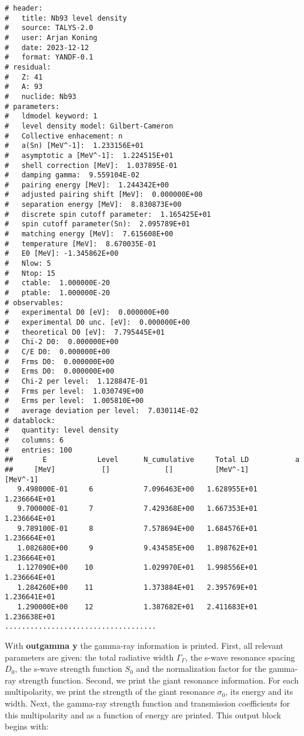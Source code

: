 \begin{samplecase}
{\begin{verbatim}
# header:
#   title: Nb93 level density
#   source: TALYS-2.0
#   user: Arjan Koning
#   date: 2023-12-12
#   format: YANDF-0.1
# residual:
#   Z: 41
#   A: 93
#   nuclide: Nb93
# parameters:
#   ldmodel keyword: 1
#   level density model: Gilbert-Cameron
#   Collective enhacement: n
#   a(Sn) [MeV^-1]:  1.233156E+01
#   asymptotic a [MeV^-1]:  1.224515E+01
#   shell correction [MeV]:  1.037895E-01
#   damping gamma:  9.559104E-02
#   pairing energy [MeV]:  1.244342E+00
#   adjusted pairing shift [MeV]:  0.000000E+00
#   separation energy [MeV]:  8.830873E+00
#   discrete spin cutoff parameter:  1.165425E+01
#   spin cutoff parameter(Sn):  2.095789E+01
#   matching energy [MeV]:  7.615608E+00
#   temperature [MeV]:  8.670035E-01
#   E0 [MeV]: -1.345862E+00
#   Nlow: 5
#   Ntop: 15
#   ctable:  1.000000E-20
#   ptable:  1.000000E-20
# observables:
#   experimental D0 [eV]:  0.000000E+00
#   experimental D0 unc. [eV]:  0.000000E+00
#   theoretical D0 [eV]:  7.795445E+01
#   Chi-2 D0:  0.000000E+00
#   C/E D0:  0.000000E+00
#   Frms D0:  0.000000E+00
#   Erms D0:  0.000000E+00
#   Chi-2 per level:  1.128847E-01
#   Frms per level:  1.030749E+00
#   Erms per level:  1.005810E+00
#   average deviation per level:  7.030114E-02
# datablock:
#   quantity: level density
#   columns: 6
#   entries: 100
##       E            Level      N_cumulative     Total LD           a       
##     [MeV]           []             []          [MeV^-1]       [MeV^-1]    
   9.498000E-01     6            7.096463E+00   1.628955E+01   1.236664E+01 
   9.700000E-01     7            7.429368E+00   1.667353E+01   1.236664E+01 
   9.789100E-01     8            7.578694E+00   1.684576E+01   1.236664E+01 
   1.082680E+00     9            9.434585E+00   1.898762E+01   1.236664E+01 
   1.127090E+00    10            1.029970E+01   1.998556E+01   1.236664E+01 
   1.284260E+00    11            1.373884E+01   2.395769E+01   1.236641E+01 
   1.290000E+00    12            1.387682E+01   2.411683E+01   1.236638E+01
....................................
\end{verbatim} } \renewcommand{\baselinestretch}{1.07}\small\normalsize
\noindent

With {\bf outgamma y} the gamma-ray information is printed. 
First, all relevant parameters are given: the total radiative width 
$\Gamma_{\Gamma}$, the s-wave resonance spacing $D_{0}$, 
the s-wave strength function $S_{0}$ and the normalization factor for the
gamma-ray strength function. Second, we print the giant resonance information.
For each multipolarity, we print the strength of the giant resonance
$\sigma_{0}$, its energy and its width.
Next, the gamma-ray strength function and transmission coefficients for this 
multipolarity and as a function of energy are printed.
This output block begins with:


\end{samplecase}

